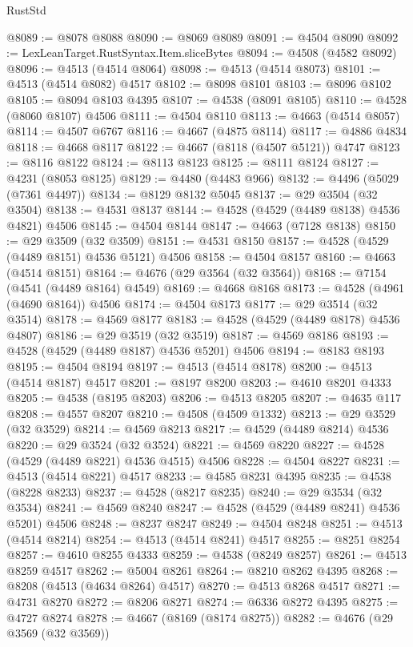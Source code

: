 \begin{lexlean}{RustStd}
\begin{coremodule}
@8089 := @8078 @8088
@8090 := @8069 @8089
@8091 := @4504 @8090
@8092 := LexLeanTarget.RustSyntax.Item.sliceBytes
@8094 := @4508 (@4582 @8092)
@8096 := @4513 (@4514 @8064)
@8098 := @4513 (@4514 @8073)
@8101 := @4513 (@4514 @8082) @4517
@8102 := @8098 @8101
@8103 := @8096 @8102
@8105 := @8094 @8103 @4395
@8107 := @4538 (@8091 @8105)
@8110 := @4528 (@8060 @8107) @4506
@8111 := @4504 @8110
@8113 := @4663 (@4514 @8057)
@8114 := @4507 @6767
@8116 := @4667 (@4875 @8114)
@8117 := @4886 @4834
@8118 := @4668 @8117
@8122 := @4667 (@8118 (@4507 @5121)) @4747
@8123 := @8116 @8122
@8124 := @8113 @8123
@8125 := @8111 @8124
@8127 := @4231 (@8053 @8125)
@8129 := @4480 (@4483 @966)
@8132 := @4496 (@5029 (@7361 @4497))
@8134 := @8129 @8132 @5045
@8137 := @29 @3504 (@32 @3504)
@8138 := @4531 @8137
@8144 := @4528 (@4529 (@4489 @8138) @4536 @4821) @4506
@8145 := @4504 @8144
@8147 := @4663 (@7128 @8138)
@8150 := @29 @3509 (@32 @3509)
@8151 := @4531 @8150
@8157 := @4528 (@4529 (@4489 @8151) @4536 @5121) @4506
@8158 := @4504 @8157
@8160 := @4663 (@4514 @8151)
@8164 := @4676 (@29 @3564 (@32 @3564))
@8168 := @7154 (@4541 (@4489 @8164) @4549)
@8169 := @4668 @8168
@8173 := @4528 (@4961 (@4690 @8164)) @4506
@8174 := @4504 @8173
@8177 := @29 @3514 (@32 @3514)
@8178 := @4569 @8177
@8183 := @4528 (@4529 (@4489 @8178) @4536 @4807)
@8186 := @29 @3519 (@32 @3519)
@8187 := @4569 @8186
@8193 := @4528 (@4529 (@4489 @8187) @4536 @5201) @4506
@8194 := @8183 @8193
@8195 := @4504 @8194
@8197 := @4513 (@4514 @8178)
@8200 := @4513 (@4514 @8187) @4517
@8201 := @8197 @8200
@8203 := @4610 @8201 @4333
@8205 := @4538 (@8195 @8203)
@8206 := @4513 @8205
@8207 := @4635 @117
@8208 := @4557 @8207
@8210 := @4508 (@4509 @1332)
@8213 := @29 @3529 (@32 @3529)
@8214 := @4569 @8213
@8217 := @4529 (@4489 @8214) @4536
@8220 := @29 @3524 (@32 @3524)
@8221 := @4569 @8220
@8227 := @4528 (@4529 (@4489 @8221) @4536 @4515) @4506
@8228 := @4504 @8227
@8231 := @4513 (@4514 @8221) @4517
@8233 := @4585 @8231 @4395
@8235 := @4538 (@8228 @8233)
@8237 := @4528 (@8217 @8235)
@8240 := @29 @3534 (@32 @3534)
@8241 := @4569 @8240
@8247 := @4528 (@4529 (@4489 @8241) @4536 @5201) @4506
@8248 := @8237 @8247
@8249 := @4504 @8248
@8251 := @4513 (@4514 @8214)
@8254 := @4513 (@4514 @8241) @4517
@8255 := @8251 @8254
@8257 := @4610 @8255 @4333
@8259 := @4538 (@8249 @8257)
@8261 := @4513 @8259 @4517
@8262 := @5004 @8261
@8264 := @8210 @8262 @4395
@8268 := @8208 (@4513 (@4634 @8264) @4517)
@8270 := @4513 @8268 @4517
@8271 := @4731 @8270
@8272 := @8206 @8271
@8274 := @6336 @8272 @4395
@8275 := @4727 @8274
@8278 := @4667 (@8169 (@8174 @8275))
@8282 := @4676 (@29 @3569 (@32 @3569))

\end{coremodule}
\end{lexlean}
